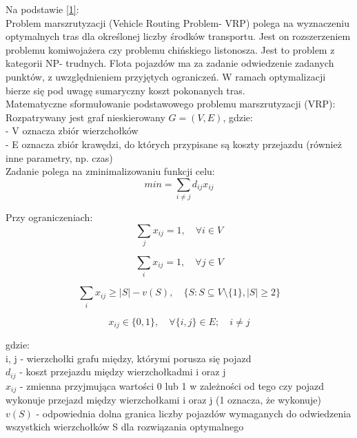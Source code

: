 \documentclass[a4paper, twoside, 12pt, justified]{article}
\begin{document}
	Na podstawie \hyperlink{vrp_all}{[1]}:\\
	Problem marszrutyzacji (Vehicle Routing Problem- VRP) polega na wyznaczeniu optymalnych tras dla określonej liczby środków transportu. Jest on rozszerzeniem problemu komiwojażera czy problemu chińskiego listonosza. Jest to problem z kategorii NP- trudnych. Flota pojazdów ma za zadanie odwiedzenie zadanych punktów, z uwzględnieniem przyjętych ograniczeń. W ramach optymalizacji bierze się pod uwagę sumaryczny koszt pokonanych tras. \\
	Matematyczne sformułowanie podstawowego problemu marszrutyzacji (VRP):\\
	Rozpatrywany jest graf nieskierowany $G=(V,E)$, gdzie:\\
	- V oznacza zbiór wierzchołków\\ 
	- E oznacza zbiór krawędzi, do których przypisane są koszty przejazdu (również inne parametry, np. czas)
	\\
	Zadanie polega na zminimalizowaniu funkcji celu:
	\begin{equation}
	{min =\sum\limits_{i \neq j} d_{ij} x_{ij} }
	\end{equation}
	
	Przy ograniczeniach:\\
	
	\begin{equation}
	{\sum\limits_{j} x_{ij} = 1, \quad \forall i \in V }
	\end{equation}
	
	\begin{equation}
	{\sum\limits_{i} x_{ij} = 1, \quad \forall j \in V }
	\end{equation}
	
	\begin{equation}
	{\sum\limits_{i} x_{ij} \geq |S| - v(S), \quad \{S : S \subseteq V \setminus\{1\}, |S| \geq 2  \} }
	\end{equation}
	
	\begin{equation}
	{x_{ij} \in \{0,1\}, \quad \forall\{i,j\} \in E ; \quad i \neq j }
	\end{equation}
	
	gdzie:\\
	i, j - wierzchołki grafu między, którymi porusza się pojazd\\
	$d_{ij}$ - koszt przejazdu między wierzchołkadmi i oraz j\\
	$x_{ij}$ - zmienna przyjmująca wartości 0 lub 1 w zależności od tego czy pojazd wykonuje przejazd między wierzchołkami i oraz j (1 oznacza, że wykonuje) \\
	$v(S)$ - odpowiednia dolna granica liczby pojazdów wymaganych do odwiedzenia wszystkich wierzchołków S dla rozwiązania optymalnego\\
\end{document}
